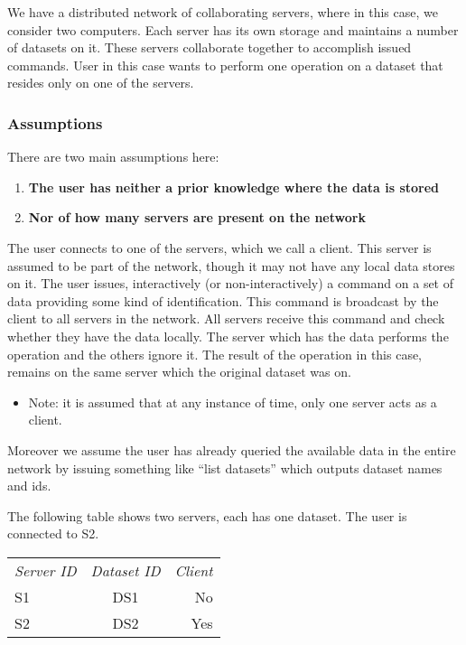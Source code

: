 We have a distributed network of collaborating servers, where in this case, we consider two computers. 
Each server has its own storage and maintains a number of datasets on it. These servers collaborate 
together to accomplish issued commands. User in this case wants to perform one operation on a dataset
that resides only on one of the servers. 

\subsubsection{Assumptions}
There are two main assumptions here:
\begin{enumerate}
\item \textbf{The user has neither a prior knowledge where the data is stored}
\item \textbf{Nor of how many servers are present on the network}
\end{enumerate}

The user connects to one of the servers, which we call a client. This server is assumed to be part 
of the network, though it may not have any local data stores on it. The user issues, interactively
(or non-interactively) a command on a set of data providing some kind of identification. This command
is broadcast by the client to all servers in the network. All servers receive this command and check
whether they have the data locally. The server which has the data performs the operation and the others
ignore it. The result of the operation in this case, remains on the same server which the original 
dataset was on. 

\begin{itemize}
\item Note: it is assumed that at any instance of time, only one server acts as a client.
\end{itemize}

Moreover we assume the user has already queried the available data in the entire network by 
issuing something like “list datasets” which outputs dataset names and ids.

The following table shows two servers, each has one dataset. The user is connected to S2.\\

\begin{tabular}{ l c r }
\em{Server ID} & \em{ Dataset ID} & \em{ Client} \\
S1 & DS1 & No \\
S2 & DS2 & Yes \\
\end{tabular}\\

